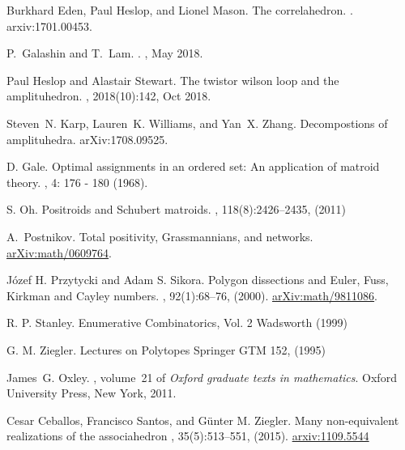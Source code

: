 \documentclass[11pt]{article}
\theoremstyle{remark}
\theoremstyle{definition}
\begin{document}
\begin{thebibliography}{50}
Burkhard Eden, Paul Heslop, and Lionel Mason.
\newblock The correlahedron.
.
\newblock arxiv:1701.00453.

P.~{Galashin} and T.~{Lam}.
.
, May 2018.

Paul Heslop and Alastair Stewart.
\newblock The twistor wilson loop and the amplituhedron.
, 2018(10):142, Oct 2018.

Steven~N. Karp, Lauren~K. Williams, and Yan~X. Zhang.
\newblock Decompostions of amplituhedra.
\newblock arXiv:1708.09525.

D. Gale.
\newblock Optimal assignments in an ordered set: {A}n application of matroid theory.
, 4: 176 - 180 (1968).

S. Oh.
\newblock Positroids and {S}chubert matroids.
, 118(8):2426--2435, (2011)


A.~Postnikov.
\newblock Total positivity, {G}rassmannians, and networks.
\newblock \url{arXiv:math/0609764}.

  J\'ozef H. Przytycki and Adam S. Sikora.
  \newblock Polygon dissections and {E}uler, {F}uss, {K}irkman and {C}ayley numbers.
  , 92(1):68--76, (2000). \url{arXiv:math/9811086}.

  R. P. Stanley.
  \newblock Enumerative Combinatorics, Vol. 2
  \newblock Wadsworth (1999)

  G. M. Ziegler.
  \newblock Lectures on Polytopes
  \newblock Springer GTM 152, (1995)

James~G. Oxley.
, volume~21 of {\em Oxford graduate texts in
  mathematics}.
\newblock Oxford University Press, New York, 2011.


  Cesar Ceballos, Francisco Santos, and G\"unter M. Ziegler.
  \newblock Many non-equivalent realizations of the associahedron
  , 35(5):513--551, (2015).  \url{arxiv:1109.5544}


\end{thebibliography}
\end{document}
